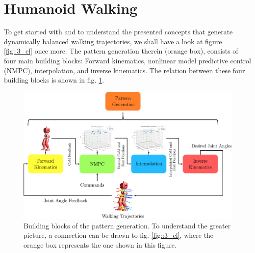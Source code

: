 \section{Humanoid Walking}
\label{sec::31_hw}
To get started with and to understand the presented concepts that generate dynamically balanced walking trajectories, we shall have a look at figure \ref{fig::3_cl} once more. The pattern generation therein (orange box), consists of four main building blocks: Forward kinematics, nonlinear model predictive control (NMPC), interpolation, and inverse kinematics. The relation between these four building blocks is shown in fig. \ref{fig::31_pg}.
\begin{figure}[h]
	\centering
	\includegraphics[scale=.5]{chapters/03_background/img/pattern_generation.png}
	\caption{Building blocks of the pattern generation. To understand the greater picture, a connection can be drawn to fig. \ref{fig::3_cl}, where the orange box represents the one shown in this figure.}
	\label{fig::31_pg}
\end{figure}
